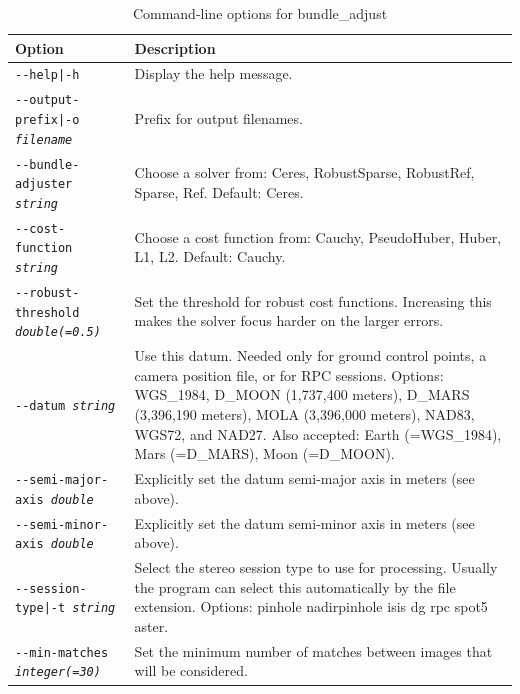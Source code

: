 \begin{longtable}{|p{8cm}|p{9cm}|}
\caption{Command-line options for bundle\_adjust}
\label{tbl:bundleadjust}
\endfirsthead
\endhead
\endfoot
\endlastfoot
\hline
Option & Description \\ \hline \hline
\texttt{-\/-help|-h} & Display the help message. \\ \hline

\texttt{-\/-output-prefix|-o \textit{filename}} & Prefix for output filenames. \\ \hline

\texttt{-\/-bundle-adjuster \textit{string}} & Choose a solver from:
Ceres, RobustSparse, RobustRef, Sparse, Ref. Default: Ceres.\\ \hline

\texttt{-\/-cost-function \textit{string}} & Choose a cost function
from: Cauchy, PseudoHuber, Huber, L1, L2. Default: Cauchy. \\ \hline

\texttt{-\/-robust-threshold \textit{double(=0.5)}} & Set the threshold for robust
cost functions.  Increasing this makes the solver focus harder on the larger errors.\\ \hline

\texttt{-\/-datum \textit{string}} & 
Use this datum. Needed only for ground control points, a camera position file, or for RPC sessions. Options: WGS\_1984, D\_MOON (1,737,400 meters), D\_MARS (3,396,190 meters), MOLA (3,396,000 meters), NAD83, WGS72, and NAD27. Also accepted: Earth (=WGS\_1984), Mars (=D\_MARS), Moon (=D\_MOON). \\ \hline

\texttt{-\/-semi-major-axis \textit{double}} & Explicitly set the datum semi-major axis
in meters (see above).\\ \hline
\texttt{-\/-semi-minor-axis \textit{double}} & Explicitly set the datum semi-minor axis
in meters (see above).\\ \hline

\texttt{-\/-session-type|-t \textit{string}} & Select the stereo
session type to use for processing. Usually the program can select this
automatically by the file extension. Options: pinhole nadirpinhole isis dg rpc spot5 aster. \\ \hline

\texttt{-\/-min-matches \textit{integer(=30)}} & Set the minimum number of matches
between images that will be considered. \\ \hline


\end{longtable}
